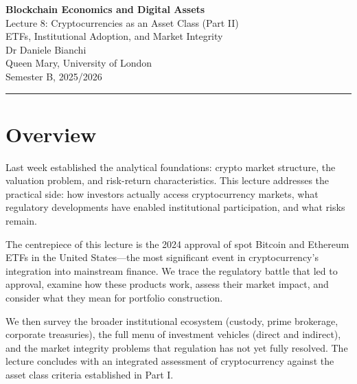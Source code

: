 \documentclass[11pt,a4paper]{article}
\begin{document}
\begin{center}
    {\LARGE\bfseries\textcolor{ImperialBlue}{Blockchain Economics and Digital Assets}}\\[0.5em]
    {\Large Lecture 8: Cryptocurrencies as an Asset Class (Part II)}\\[0.3em]
    {\large ETFs, Institutional Adoption, and Market Integrity}\\[1em]
    {\large Dr Daniele Bianchi}\\[0.5em]
    {\normalsize Queen Mary, University of London}\\[0.3em]
    {\normalsize Semester B, 2025/2026}
\end{center}

\vspace{1em}
\hrule
\vspace{1em}

\tableofcontents

\vspace{2cm}

\section*{Overview}

Last week established the analytical foundations: crypto market structure, the valuation problem, and risk-return characteristics. This lecture addresses the practical side: how investors actually access cryptocurrency markets, what regulatory developments have enabled institutional participation, and what risks remain.

The centrepiece of this lecture is the 2024 approval of spot Bitcoin and Ethereum ETFs in the United States---the most significant event in cryptocurrency's integration into mainstream finance. We trace the regulatory battle that led to approval, examine how these products work, assess their market impact, and consider what they mean for portfolio construction.

We then survey the broader institutional ecosystem (custody, prime brokerage, corporate treasuries), the full menu of investment vehicles (direct and indirect), and the market integrity problems that regulation has not yet fully resolved. The lecture concludes with an integrated assessment of cryptocurrency against the asset class criteria established in Part I.
\end{document}
